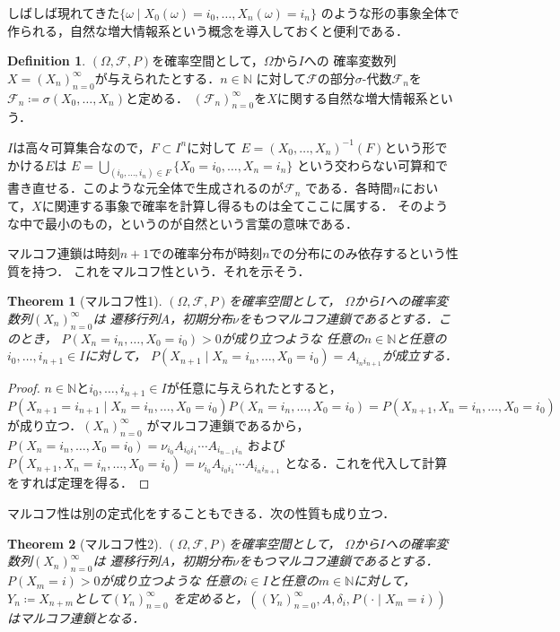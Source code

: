 \documentclass[dvipdfmx,autodetect-engine]{jsarticle}
\newtheorem{theorem}{Theorem}[section]
\theoremstyle{remark}
\theoremstyle{definition}
\newtheorem{definition}{Definition}[section]
\newcommand{\N}{\mathbb{N}}
\begin{document}
しばしば現れてきた$\{ \omega \mid X_0 (\omega)= i_0,\ldots, X_n (\omega)= i_n\}$
のような形の事象全体で作られる，自然な増大情報系という概念を導入しておくと便利である．


\begin{definition}
    $(\Omega,\mathcal{F},P)$を確率空間として，$\Omega$から$I$への
    確率変数列$X = (X_n)_{n=0}^{\infty}$が与えられたとする．$n \in \N$
    に対して$\mathcal{F}$の部分$\sigma$-代数$\mathcal{F}_n$を
    $\mathcal{F}_n \coloneqq \sigma (X_0,\ldots,X_n)$と定める．
    $(\mathcal{F}_n)_{n =0}^{\infty}$を$X$に関する自然な増大情報系という．
\end{definition}


$I$は高々可算集合なので，$F\subset I^n$に対して
$E = (X_0,\ldots,X_n)^{-1} (F)$という形でかける$E$は
$E = \bigcup_{(i_0,\ldots,i_n) \in F} \{X_0 = i_0,\ldots,X_n = i_n\}$
という交わらない可算和で書き直せる．このような元全体で生成されるのが$\mathcal{F}_n$
である．各時間$n$において，$X$に関連する事象で確率を計算し得るものは全てここに属する．
そのような中で最小のもの，というのが自然という言葉の意味である．

マルコフ連鎖は時刻$n+1$での確率分布が時刻$n$での分布にのみ依存するという性質を持つ．
これをマルコフ性という．それを示そう．

\begin{theorem}[マルコフ性1]
    $(\Omega,\mathcal{F},P)$を確率空間として，
    $\Omega$から$I$への確率変数列$(X_n)_{n=0}^{\infty}$は
    遷移行列$A$，初期分布$\nu$をもつマルコフ連鎖であるとする．このとき，
    $P(X_n = i_n,\ldots,X_0 = i_0) >0$が成り立つような
    任意の$n \in \N$と任意の$i_0,\ldots,i_{n+1} \in I$に対して，
    $P(X_{n+1} \mid X_n = i_n,\ldots,X_0 = i_0)=A_{i_n i_{n+1}}$が成立する．
\end{theorem}

\begin{proof}
    $n \in \N$と$i_0,\ldots,i_{n+1} \in I$が任意に与えられたとすると，
    $P(X_{n+1}=i_{n+1} \mid X_n = i_n,\ldots,X_0 = i_0)P(X_n = i_n,\ldots,X_0 = i_0) 
    = P(X_{n+1},X_n = i_n,\ldots,X_0 = i_0)$が成り立つ．$(X_n)_{n=0}^{\infty}$
    がマルコフ連鎖であるから，$P(X_n = i_n,\ldots,X_0 = i_0) = \nu_{i_0} A_{i_0 i_1} \cdots A_{i_{n-1} i_n}$
    および$P(X_{n+1},X_n = i_n,\ldots,X_0 = i_0) = \nu_{i_0} A_{i_0 i_1} \cdots A_{i_{n} i_{n+1}}$
    となる．これを代入して計算をすれば定理を得る．
\end{proof}

マルコフ性は別の定式化をすることもできる．次の性質も成り立つ．
\begin{theorem}[マルコフ性2]\label{markov_prop2}
    $(\Omega,\mathcal{F},P)$を確率空間として，
    $\Omega$から$I$への確率変数列$(X_n)_{n=0}^{\infty}$は
    遷移行列$A$，初期分布$\nu$をもつマルコフ連鎖であるとする．
    $P(X_m = i) >0$が成り立つような
    任意の$i \in I$と任意の$m \in \N$に対して，
    $Y_n \coloneqq X_{n+m}$として$(Y_n)_{n=0}^{\infty}$
    を定めると，$((Y_n)_{n=0}^{\infty},A,\delta_i, P(\cdot \mid X_m = i))$
    はマルコフ連鎖となる．
\end{theorem}
\end{document}
